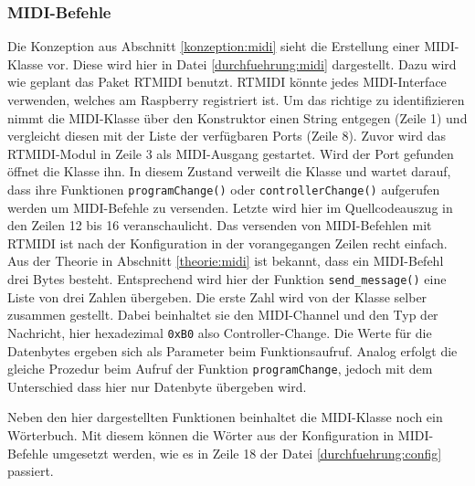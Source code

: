 \subsubsection{MIDI-Befehle}
Die Konzeption aus Abschnitt \ref{konzeption:midi} sieht die Erstellung einer MIDI-Klasse vor. Diese wird hier in Datei \ref{durchfuehrung:midi} dargestellt. Dazu wird wie geplant das Paket RTMIDI benutzt. RTMIDI könnte jedes MIDI-Interface verwenden, welches am Raspberry registriert ist. Um das richtige zu identifizieren nimmt die MIDI-Klasse über den Konstruktor einen String entgegen (Zeile 1) und vergleicht diesen mit der Liste der verfügbaren Ports (Zeile 8). Zuvor wird das RTMIDI-Modul in Zeile 3 als MIDI-Ausgang gestartet. Wird der Port gefunden öffnet die Klasse ihn. In diesem Zustand verweilt die Klasse und wartet darauf, dass ihre Funktionen \lstinline[language=mypython]{programChange()} oder \lstinline[language=mypython]{controllerChange()} aufgerufen werden um MIDI-Befehle zu versenden. Letzte wird hier im Quellcodeauszug in den Zeilen 12 bis 16 veranschaulicht. Das versenden von MIDI-Befehlen mit RTMIDI ist nach der Konfiguration in der vorangegangen Zeilen recht einfach. Aus der Theorie in Abschnitt \ref{theorie:midi} ist bekannt, dass ein MIDI-Befehl drei Bytes besteht. Entsprechend wird hier der Funktion \lstinline[language=mypython]{send_message()} eine Liste von drei Zahlen übergeben. Die erste Zahl wird von der Klasse selber zusammen gestellt. Dabei beinhaltet sie den MIDI-Channel und den Typ der Nachricht, hier hexadezimal \lstinline[language=mypython]{0xB0} also Controller-Change. Die Werte für die Datenbytes ergeben sich als Parameter beim Funktionsaufruf. Analog erfolgt die gleiche Prozedur beim Aufruf der Funktion \lstinline[language=mypython]{programChange}, jedoch mit dem Unterschied dass hier nur Datenbyte übergeben wird.  

Neben den hier dargestellten Funktionen beinhaltet die MIDI-Klasse noch ein Wörterbuch. Mit diesem können die Wörter aus der Konfiguration in MIDI-Befehle umgesetzt werden, wie es in Zeile 18 der Datei \ref{durchfuehrung:config} passiert.
 

